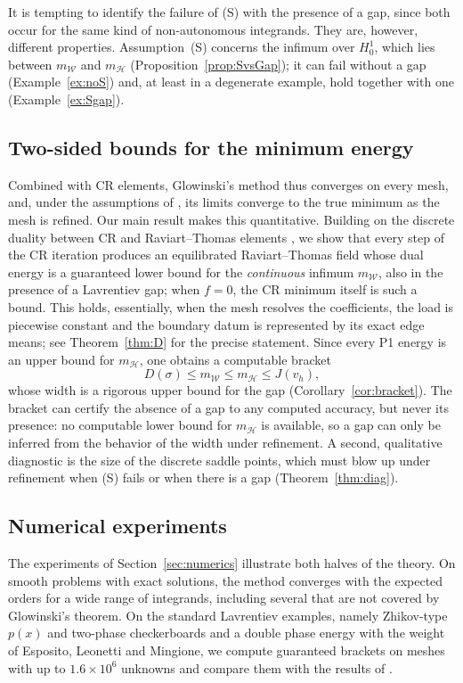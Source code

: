 \documentclass[11pt]{amsart}
\theoremstyle{definition}
\theoremstyle{remark}
\numberwithin{equation}{section}
\newcommand{\mW}{m_{\mathcal W}}
\newcommand{\mH}{m_{\mathcal H}}
\begin{document}
It is tempting to identify the failure of (S) with the presence of a gap, since both occur for the same kind of non-autonomous integrands. They are, however, different properties. Assumption~(S) concerns the infimum over $H^1_0$, which lies between $\mW$ and $\mH$ (Proposition~\ref{prop:SvsGap}); it can fail without a gap (Example~\ref{ex:noS}) and, at least in a degenerate example, hold together with one (Example~\ref{ex:Sgap}).

\subsection*{Two-sided bounds for the minimum energy}
Combined with CR elements, Glowinski's method thus converges on every mesh, and, under the assumptions of \cite{BalciOrtnerStorn2022}, its limits converge to the true minimum as the mesh is refined. Our main result makes this quantitative. Building on the discrete duality between CR and Raviart--Thomas elements \cite{Bartels2021}, we show that every step of the CR iteration produces an equilibrated Raviart--Thomas field whose dual energy is a guaranteed lower bound for the \emph{continuous} infimum $\mW$, also in the presence of a Lavrentiev gap; when $f=0$, the CR minimum itself is such a bound. This holds, essentially, when the mesh resolves the coefficients, the load is piecewise constant and the boundary datum is represented by its exact edge means; see Theorem~\ref{thm:D} for the precise statement. Since every P1 energy is an upper bound for $\mH$, one obtains a computable bracket
\[
D(\sigma)\le\mW\le\mH\le J(v_h),
\]
whose width is a rigorous upper bound for the gap (Corollary~\ref{cor:bracket}). The bracket can certify the absence of a gap to any computed accuracy, but never its presence: no computable lower bound for $\mH$ is available, so a gap can only be inferred from the behavior of the width under refinement. A second, qualitative diagnostic is the size of the discrete saddle points, which must blow up under refinement when (S) fails or when there is a gap (Theorem~\ref{thm:diag}).

\subsection*{Numerical experiments}
The experiments of Section~\ref{sec:numerics} illustrate both halves of the theory. On smooth problems with exact solutions, the method converges with the expected orders for a wide range of integrands, including several that are not covered by Glowinski's theorem. On the standard Lavrentiev examples, namely Zhikov-type $p(x)$ and two-phase checkerboards and a double phase energy with the weight of Esposito, Leonetti and Mingione, we compute guaranteed brackets on meshes with up to $1.6\times10^6$ unknowns and compare them with the results of \cite{BalciOrtnerStorn2022}.
\end{document}
